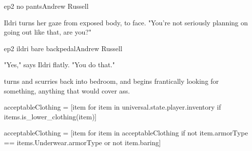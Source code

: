 \documentclass{book}
\begin{document}
\begin{childnode}{ep2 no pants}{Andrew Russell}

    Ildri turns her gaze from \names{} exposed body, to \hisher{} face. "You're not seriously planning on going out like that, are you?"



\end{childnode}

\begin{childnode}{ep2 ildri bare backpedal}{Andrew Russell}

    "Yes," says Ildri flatly. "You do that."

    \name{} turns and scurries back into \hisher{} bedroom, and begins frantically looking for something, anything that would cover \hisher{} ass.

    \begin{code}

        acceptableClothing = [item for item in universal.state.player.inventory if items.is\_lower\_clothing(item)]

        acceptableClothing = [item for item in acceptableClothing if not item.armorType == items.Underwear.armorType or not item.baring]

    \end{code}



\end{childnode}
\end{document}
